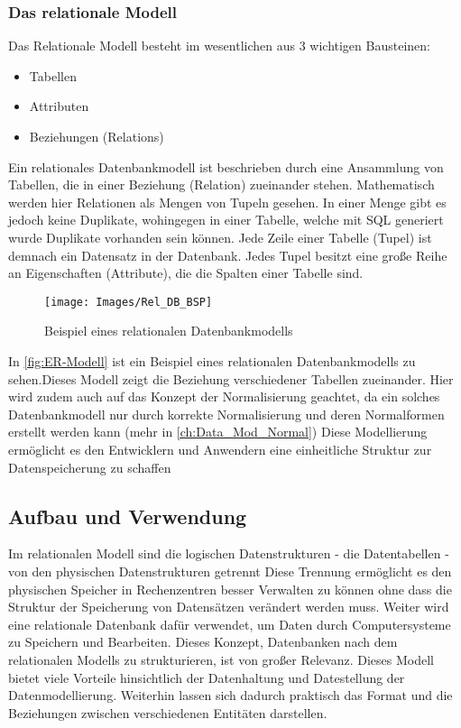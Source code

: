 \subsubsection{Das relationale Modell}
Das Relationale Modell besteht im wesentlichen aus 3 wichtigen Bausteinen:
\begin{itemize}
	\item {Tabellen}
	\item {Attributen}
	\item {Beziehungen (Relations)}
\end{itemize}
Ein relationales Datenbankmodell ist beschrieben durch eine Ansammlung von Tabellen, die in einer Beziehung (Relation) zueinander stehen. Mathematisch werden hier Relationen als Mengen von Tupeln gesehen. In einer Menge gibt es jedoch keine Duplikate, wohingegen in einer Tabelle, welche mit SQL generiert wurde Duplikate vorhanden sein können.  Jede Zeile einer Tabelle (Tupel) ist demnach ein Datensatz in der Datenbank. Jedes Tupel besitzt eine große Reihe an Eigenschaften (Attribute), die die Spalten einer Tabelle sind. \cite{DatenbankenVerstehen:Relationales_Datenbankmodell}\cite{Huckert:VL4_5}
\begin{figure}[H]
	\begin{center}
		\texttt{[image: Images/Rel\_DB\_BSP]}
		\caption{Beispiel eines relationalen Datenbankmodells \cite{DatenbankenVerstehen:Relationales_Datenbankmodell}}
		\label{fig:ER-Modell}
	\end{center}
\end{figure}
In \autoref{fig:ER-Modell} ist ein Beispiel eines relationalen Datenbankmodells zu sehen.Dieses Modell zeigt die Beziehung verschiedener Tabellen zueinander. Hier wird zudem auch auf das Konzept der Normalisierung geachtet, da ein solches Datenbankmodell nur durch korrekte Normalisierung und deren Normalformen erstellt werden kann (mehr in \autoref{ch:Data_Mod_Normal})
Diese Modellierung ermöglicht es den Entwicklern und Anwendern eine einheitliche Struktur zur Datenspeicherung zu schaffen\cite{Oracle:rel_DB}
\subsection{Aufbau und Verwendung}
\glqq Im relationalen Modell sind die logischen Datenstrukturen - die Datentabellen - von den physischen Datenstrukturen getrennt\grqq\cite{Oracle:rel_DB}\newline
Diese Trennung ermöglicht es den physischen Speicher in Rechenzentren besser Verwalten zu können ohne dass die Struktur der Speicherung von Datensätzen verändert werden muss. Weiter wird eine relationale Datenbank dafür verwendet, um Daten durch Computersysteme zu Speichern und Bearbeiten. \cite{Oracle:rel_DB}\cite{Bigdata-Insider:rel_DB}
Dieses Konzept, Datenbanken nach dem relationalen Modells zu strukturieren, ist von großer Relevanz. 
Dieses Modell bietet viele Vorteile hinsichtlich der Datenhaltung und Datestellung der Datenmodellierung. 
Weiterhin lassen sich dadurch praktisch das Format und die Beziehungen zwischen verschiedenen Entitäten darstellen.
